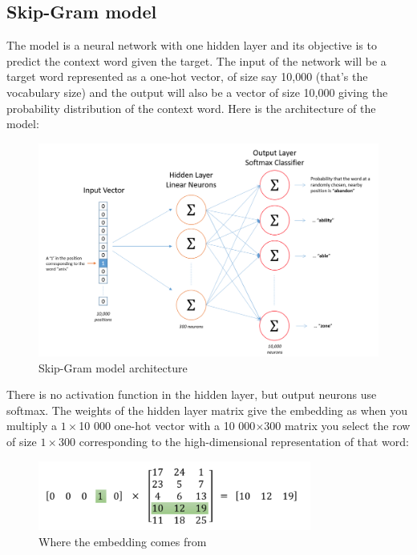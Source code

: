 \subsection{Skip-Gram model}
The model is a neural network with one hidden layer and its objective is to predict the context word given the target. The input of the network will be a target word represented as a one-hot vector, of size say 10,000 (that's the vocabulary size) and the output will also be a vector of size 10,000 giving the probability distribution of the context word. Here is the architecture of the model:

\begin{figure}[H]
    \centering
    \includegraphics[width=\textwidth]{Images/word2vec-architecture.png}
    \caption{Skip-Gram model architecture \cite{word2vec-architecture}}
\end{figure}

There is no activation function in the hidden layer, but output neurons use softmax. The weights of the hidden layer matrix give the embedding as when you multiply a $1\times$10 000 one-hot vector with a 10 000$\times300$ matrix you select the row of size $1\times300$ corresponding to the high-dimensional representation of that word: 

\begin{figure}[H]
    \centering
    \includegraphics[width=0.8\textwidth]{Images/onehot-matrix.png}
    \caption{Where the embedding comes from \cite{word2vec-architecture}}
\end{figure}

